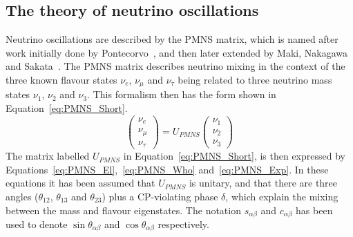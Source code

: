 \subsection{The theory of neutrino oscillations} \label{Neut_Oscil}
Neutrino oscillations are described by the PMNS matrix, which is named after work initially done by Pontecorvo~\citep{Pontecorvo1957}, and then later extended by Maki, Nakagawa and Sakata~\citep{PMNS}. The PMNS matrix describes neutrino mixing in the context of the three known flavour states $\nu_e$, $\nu_\mu$ and $\nu_\tau$ being related to three neutrino mass states $\nu_1$, $\nu_2$ and $\nu_3$. This formalism then has the form shown in Equation~\ref{eq:PMNS_Short}.
\begin{equation}
  \label{eq:PMNS_Short}
  \begin{pmatrix} \nu_e \\ \nu_\mu \\ \nu_\tau \end{pmatrix} = U_{PMNS} \begin{pmatrix} \nu_1 \\ \nu_2 \\ \nu_3 \end{pmatrix}
\end{equation}
The matrix labelled $U_{PMNS}$ in Equation~\ref{eq:PMNS_Short}, is then expressed by Equations~\ref{eq:PMNS_El},~\ref{eq:PMNS_Who} and~\ref{eq:PMNS_Exp}. In these equations it has been assumed that $U_{PMNS}$ is unitary, and that there are three angles ($\theta_{12}$, $\theta_{13}$ and $\theta_{23}$) plus a CP-violating phase $\delta$, which explain the mixing between the mass and flavour eigenstates. The notation $s_{\alpha\beta}$ and $c_{\alpha\beta}$ has been used to denote $\sin\theta_{\alpha\beta}$ and $\cos\theta_{\alpha\beta}$ respectively. \\
